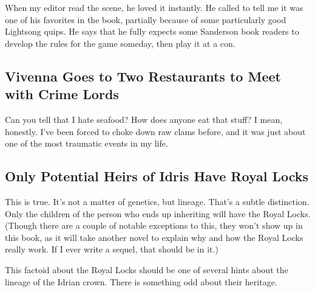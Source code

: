When my editor read the scene, he loved it instantly. He called to tell me it was one of his favorites in the book, partially because of some particularly good Lightsong quips. He says that he fully expects some Sanderson book readers to develop the rules for the game someday, then play it at a con.



\subsection*{Vivenna Goes to Two Restaurants to Meet with Crime Lords}

Can you tell that I hate seafood? How does anyone eat that stuff? I mean, honestly. I’ve been forced to choke down raw clams before, and it was just about one of the most traumatic events in my life.

\subsection*{Only Potential Heirs of Idris Have Royal Locks}

This is true. It’s not a matter of genetics, but lineage. That’s a subtle distinction. Only the children of the person who ends up inheriting will have the Royal Locks. (Though there are a couple of notable exceptions to this, they won’t show up in this book, as it will take another novel to explain why and how the Royal Locks really work. If I ever write a sequel, that should be in it.)

This factoid about the Royal Locks should be one of several hints about the lineage of the Idrian crown. There is something odd about their heritage.



